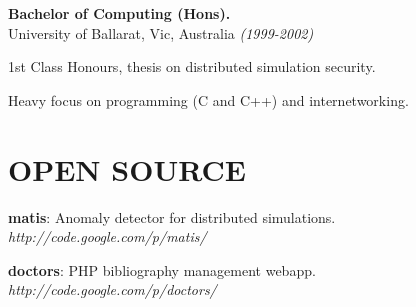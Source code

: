 \documentclass[margin]{res}
\begin{document}
\begin{resume}
{\bf Bachelor of Computing (Hons).} \\
University of Ballarat, Vic, Australia {\em (1999-2002)}
\begin{list}{}{\leftmargin=1.5em \topsep=5pt \partopsep=0pt \parsep=2.5pt}
  \item 1st Class Honours, thesis on distributed simulation security.
  \item Heavy focus on programming (C and C++) and internetworking.
\end{list}


\section{OPEN SOURCE}
\begin{list}{}{\leftmargin=0em \topsep=0pt \partopsep=0pt \parsep=2.5pt}
\item {\bf matis}: Anomaly detector for distributed simulations.  {\em http://code.google.com/p/matis/}
\item {\bf doctors}: PHP bibliography management webapp.  {\em http://code.google.com/p/doctors/}
\end{list}




 




\end{resume} 
\end{document}
